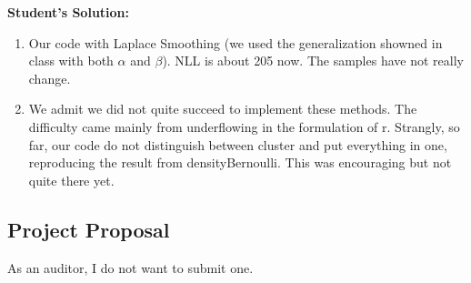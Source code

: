 \documentclass{article}
\begin{document}
\textbf{Student's Solution:}
\begin{enumerate}
  \item Our code with Laplace Smoothing (we used the generalization showned in class with both $\alpha$ and $\beta$). NLL is about 205 now. The samples have not really change.

  

  \item We admit we did not quite succeed to implement these methods. The difficulty came mainly from underflowing in the formulation of r. Strangly, so far, our code do not distinguish between cluster and put everything in one, reproducing the result from densityBernoulli. This was encouraging but not quite there yet.

    


\end{enumerate}

\subsection{Project Proposal}

As an auditor, I do not want to submit one.
\end{document}
